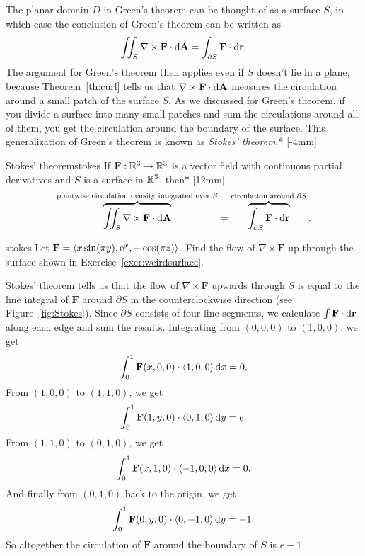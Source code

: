 \documentclass{watsonbook}
\begin{document}
The planar domain $D$ in Green's theorem can be thought of as a
surface $S$, in which case the conclusion of Green's theorem can be
written as
\[
  \iint_S \nabla \times \mathbf{F} \cdot
  \mathrm{d}\mathbf{A} =
  \int_{\partial S} \mathbf{F} \cdot
  \mathrm{d}\mathbf{r}. 
\]
The argument for Green's theorem then applies even if $S$ doesn't lie
in a plane, because Theorem~\ref{th:curl} tells us that
$\nabla \times \mathbf{F} \cdot \mathrm{d}\mathbf{A}$ measures the circulation
around a small patch of the surface $S$. As we discussed for Green's
theorem, if you divide a surface into many small patches and sum the
circulations around all of them, you get the circulation around the
boundary of the surface.  This generalization of Green's theorem is
known as \textit{Stokes' theorem}.* [-4mm]

\begin{theo}[left skip = 4.25 cm, width = \dimexpr \textwidth - 4.25
  cm \relax]{Stokes' theorem}{stokes}
  If $\mathbf{F} : \mathbb{R}^3 \to \mathbb{R}^3$ is a vector field with continuous
  partial derivatives and $S$ is a surface in $\mathbb{R}^3$, then*
  [12mm]
  \[
    \overbrace{\iint_S \nabla \times \mathbf{F} \cdot
      \mathrm{d}\mathbf{A}}^{\text{pointwise circulation density integrated
        over $S$}} =
    \overbrace{\int_{\partial S} \mathbf{F} \cdot
      \mathrm{d}\mathbf{r}}^{\text{circulation around $\partial S$}}. 
  \]
\end{theo}

\begin{example}{}{stokes}
  Let $\mathbf{F} = \langle x \sin (\pi y), \mathrm{e}^x, -\cos(\pi z)
  \rangle$. Find the flow of $\nabla \times \mathbf{F}$ up through the
  surface shown in Exercise~\ref{exer:weirdsurface}.
\end{example}

\begin{solution} 
  Stokes' theorem tells us that the flow of $\nabla \times \mathbf{F}$
  upwards through $S$ is equal to the line integral of $\mathbf{F}$
  around $\partial S$ in the counterclockwise direction (see
  Figure~\ref{fig:Stokes}). Since $\partial S$ consists of four line
  segments, we calculate $\int \mathbf{F} \cdot {\mathrm{d}}\mathbf{r}$ along
  each edge and sum the results. Integrating from $(0,0,0)$ to
  $(1,0,0)$, we get
  \[
    \int_0^1\mathbf{F}(x,0,0) \cdot \langle 1, 0, 0 \rangle  \, \mathrm{d} x =
    0. 
  \]
  From $(1,0,0)$ to $(1,1,0)$, we get
  \[
    \int_0^1\mathbf{F}(1,y,0) \cdot \langle 0, 1, 0 \rangle  \, \mathrm{d} y =
    e. 
  \]
  From $(1,1,0)$ to $(0,1,0)$, we get
  \[
    \int_0^1\mathbf{F}(x,1,0) \cdot \langle -1, 0, 0 \rangle  \, \mathrm{d} x = 0. 
  \]
  And finally from $(0,1,0)$ back to the origin, we get
  \[
    \int_0^1\mathbf{F}(0,y,0) \cdot \langle 0, -1, 0 \rangle  \, \mathrm{d} y = -1. 
  \]
  So altogether the circulation of $\mathbf{F}$ around the boundary of
  $S$ is $\boxed{e-1}$. 
\end{solution}
\end{document}

